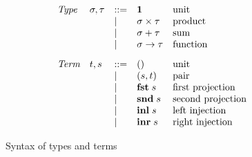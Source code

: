 \begin{figure}
  \small
  \[
  \begin{array}{lllll}
    \textit{Type} &
    \sigma, \tau
    & ::= &
    \mathbf{1}
    &
    \text{unit}
    \\
    && | &
    \sigma \times \tau
    &
    \text{product}
    \\
    && | &
    \sigma + \tau
    &
    \text{sum}
    \\
    && | &
    \sigma \to \tau
    &
    \text{function}
    \\[3mm]
    \textit{Term} &
    t, s
    & ::= &
    ()
    &
    \text{unit}
    \\
    && | &
    (s,t)
    &
    \text{pair}
    \\
    && | &
    \mathbf{fst}\;s
    &
    \text{first projection}
    \\
    && | &
    \mathbf{snd}\;s
    &
    \text{second projection}
    \\
    && | &
    \mathbf{inl}\;s
    &
    \text{left injection}
    \\
    && | &
    \mathbf{inr}\;s
    &
    \text{right injection}
  \end{array}
  \]
  \caption{Syntax of types and terms}
\end{figure}
